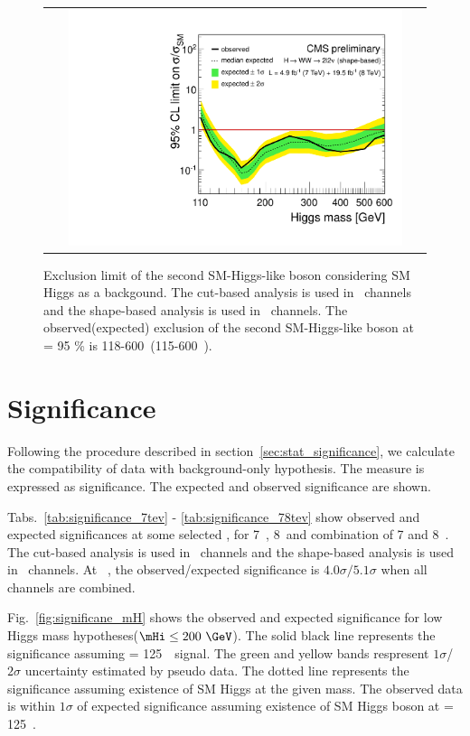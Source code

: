 \begin{figure}[htp] 
\centering 
\begin{tabular}{c} 
\includegraphics[width=0.9\textwidth]{figures/ana_Moriond13_2D_SMH_7p8TeV_bdt_from110to600_logx1_logy1.pdf} 
\end{tabular} 
\caption{Exclusion limit of the second SM-Higgs-like boson considering SM Higgs as a backgound.
The cut-based analysis is used in \SF\ channels and the shape-based analysis is used in 
\DF\ channels.
The observed(expected) exclusion of the second SM-Higgs-like boson at \CLs = 95 \% 
is 118-600~\GeV(115-600~\GeV).} 
\label{fig:limit78_secondhiggs} 
\end{figure} 




\section{Significance}

Following the procedure described in section~\ref{sec:stat_significance}, 
we calculate the compatibility of data with background-only hypothesis. 
The measure is expressed as significance. 
The expected and observed significance are shown. 

Tabs.~\ref{tab:significance_7tev} - \ref{tab:significance_78tev}  
show observed and expected significances at some selected \mHi, 
for 7~\TeV, 8~\TeV and combination of 7 and 8~\TeV.
The cut-based analysis is used in \SF\ channels 
and the shape-based analysis is used in \DF\ channels.
At ~\GeV, the observed/expected significance
is $4.0\sigma/5.1\sigma$ when all channels are combined.

Fig.~\ref{fig:significane_mH} shows the observed and expected 
significance for low Higgs mass hypotheses($\mHi\le200~\GeV$). 
The solid black line represents the significance assuming \mHi = 125~\GeV\ signal. 
The green and yellow bands respresent $1\sigma$/$2\sigma$ uncertainty 
estimated by pseudo data. The dotted line represents the significance 
assuming existence of SM Higgs at the given mass. 
The observed data is within $1\sigma$ of expected significance 
assuming existence of SM Higgs boson at \mHi = 125~\GeV.

